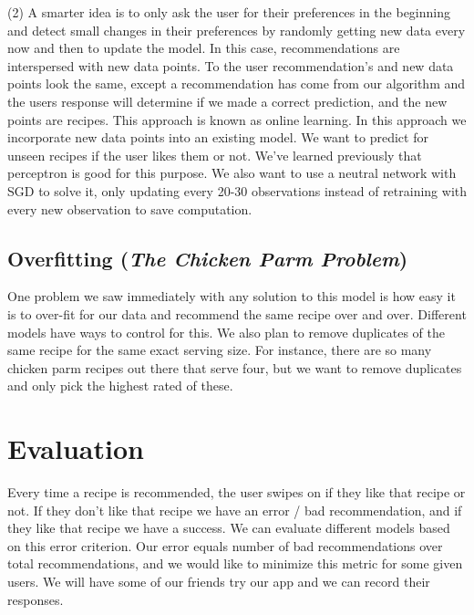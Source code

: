 \documentclass{article}
\begin{document}
    (2)  A smarter idea is to only ask the user for their preferences in the beginning and detect small changes in their preferences by randomly getting new data every now and then to update the model. In this case, recommendations are interspersed with new data points. To the user recommendation's and new data points look the same, except a recommendation has come from our algorithm and the users response will determine if we made a correct prediction, and the new points are recipes.  This approach is known as online learning. In this approach we incorporate new data points into an existing model. We want to predict for unseen recipes if the user likes them or not. We've learned previously that perceptron is good for this purpose. We also want to use a neutral network with SGD to solve it, only updating every 20-30 observations instead of retraining with every new observation to save computation.

    \subsection{Overfitting (\textit{The Chicken Parm Problem})}
    
    One problem we saw immediately with any solution to this model is how easy it is to over-fit for our data and recommend the same recipe over and over. Different models have ways to control for this. We also plan to remove duplicates of the same recipe for the same exact serving size. For instance, there are so many chicken parm recipes out there that serve four, but we want to remove duplicates and only pick the highest rated of these.
    
\section{Evaluation}
    Every time a recipe is recommended, the user swipes on if they like that recipe or not. If they don't like that recipe we have an error / bad recommendation, and if they like that recipe we have a success. We can evaluate different models based on this error criterion. Our error equals number of bad recommendations over total recommendations, and we would like to minimize this metric for some given users. We will have some of our friends try our app and we can record their responses.
\end{document}
